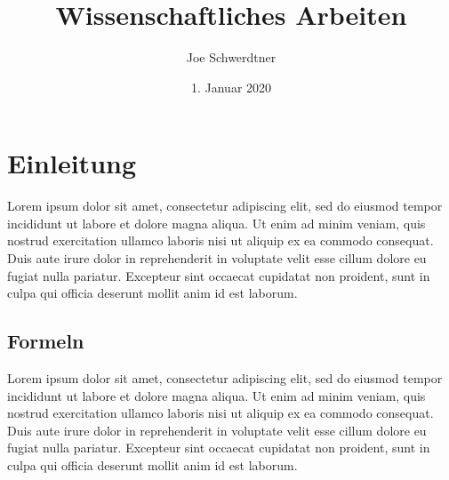 


\title{Wissenschaftliches Arbeiten}
\author{Joe Schwerdtner}
\date{1. Januar 2020}


    \maketitle
    \tableofcontents

    \section{Einleitung}
    Lorem ipsum dolor sit amet, consectetur adipiscing elit, sed do eiusmod tempor incididunt ut labore et dolore magna aliqua. Ut enim ad minim veniam, quis nostrud exercitation ullamco laboris nisi ut aliquip ex ea commodo consequat. Duis aute irure dolor in reprehenderit in voluptate velit esse cillum dolore eu fugiat nulla pariatur. Excepteur sint occaecat cupidatat non proident, sunt in culpa qui officia deserunt mollit anim id est laborum.
    \subsection{Formeln}
    Lorem ipsum dolor sit amet, consectetur adipiscing elit, sed do eiusmod tempor incididunt ut labore et dolore magna aliqua. Ut enim ad minim veniam, quis nostrud exercitation ullamco laboris nisi ut aliquip ex ea commodo consequat. Duis aute irure dolor in reprehenderit in voluptate velit esse cillum dolore eu fugiat nulla pariatur. Excepteur sint occaecat cupidatat non proident, sunt in culpa qui officia deserunt mollit anim id est laborum.
